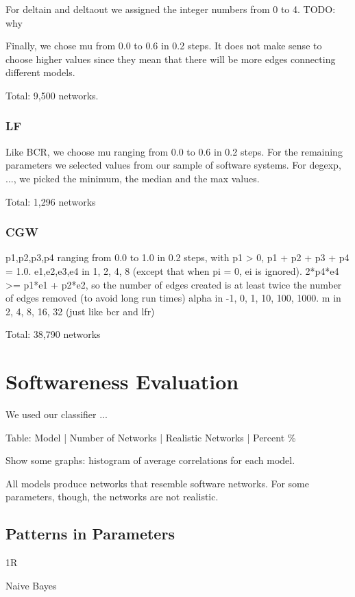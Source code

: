 For deltain and deltaout we assigned the integer numbers from 0 to 4. TODO: why

Finally, we chose mu from 0.0 to 0.6 in 0.2 steps. It does not make sense to
choose higher values since they mean that there will be more edges connecting
different models.

Total: 9,500 networks.

\subsubsection{LF}

Like BCR, we choose mu ranging from 0.0 to 0.6 in 0.2 steps. For the remaining
parameters we selected values from our sample of software systems. For degexp,
..., we picked the minimum, the median and the max values.

Total: 1,296 networks

\subsubsection{CGW}

p1,p2,p3,p4 ranging from 0.0 to 1.0 in 0.2 steps, with p1 > 0, p1 + p2 + p3 + p4 = 1.0.
e1,e2,e3,e4 in 1, 2, 4, 8 (except that when pi = 0, ei is ignored).
2*p4*e4 >= p1*e1 + p2*e2, so the number of edges created is at least twice
the number of edges removed (to avoid long run times)
alpha in -1, 0, 1, 10, 100, 1000. 
m in 2, 4, 8, 16, 32 (just like bcr and lfr)

Total: 38,790 networks

\section{Softwareness Evaluation}

We used our classifier ...

Table: Model | Number of Networks | Realistic Networks | Percent \%

Show some graphs: histogram of average correlations for each model.

All models produce networks that resemble software networks.  For some
parameters, though, the networks are not realistic.

\subsection{Patterns in Parameters}

1R

Naive Bayes


